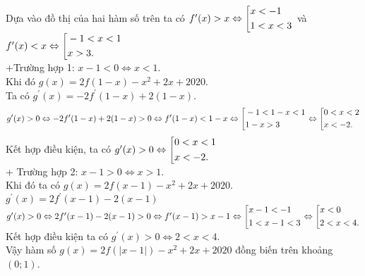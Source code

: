 \begin{ex}
{\begin{center}
		\end{center}
		Dựa vào đồ thị của hai hàm số trên ta có $f^{\prime}(x)>x \Leftrightarrow\left[\begin{aligned}&x<-1 \\ &1<x<3\end{aligned}\right.$ và
		$ f^{\prime}(x)<x \Leftrightarrow\left[\begin{aligned}&
			-1<x<1 \\
			&x>3.\end{aligned}\right.$\\
		+Trường hợp 1: $x-1<0 \Leftrightarrow x<1$.\\
		Khi đó $g(x)=2 f(1-x)-x^2+2 x+2020$.\\
		Ta có $g^{\prime}(x)=-2 f^{\prime}(1-x)+2(1-x)$.
		$$
		g^{\prime}(x)>0 \Leftrightarrow-2 f^{\prime}(1-x)+2(1-x)>0 \Leftrightarrow f^{\prime}(1-x)<1-x \Leftrightarrow\left[\begin{aligned}
			&- 1 < 1 - x < 1\\
			&1 - x > 3\end{aligned}\right. \Leftrightarrow \left[\begin{aligned}&
			0<x<2 \\
			&x<-2.\end{aligned}\right.
		$$
		Kết hợp điều kiện, ta có $g^{\prime}(x)>0 \Leftrightarrow\left[\begin{aligned}&0<x<1 \\ &x<-2.\end{aligned}\right.$\\
		
		+ Trường hợp 2: $x-1>0 \Leftrightarrow x>1$.\\
		Khi đó ta có $g(x)=2 f(x-1)-x^2+2 x+2020$.\\
		$ g^{\prime}(x)=2 f^{\prime}(x-1)-2(x-1)$\\
		$g^{\prime}(x)>0 \Leftrightarrow 2 f^{\prime}(x-1)-2(x-1)>0 \Leftrightarrow f^{\prime}(x-1)>x-1 \Leftrightarrow\left[\begin{aligned}&
			x - 1 < - 1\\
			&1 < x - 1 < 3\end{aligned}\right.\Leftrightarrow \left[\begin{aligned}
			&x<0 \\
			&2<x<4.\end{aligned}\right.$
		Kết hợp điều kiện ta có $g^{\prime}(x)>0 \Leftrightarrow 2<x<4$.\\
		Vậy hàm số $g(x)=2 f(|x-1|)-x^2+2 x+2020$ đồng biến trên khoảng $(0 ; 1)$.
	}
\end{ex}

